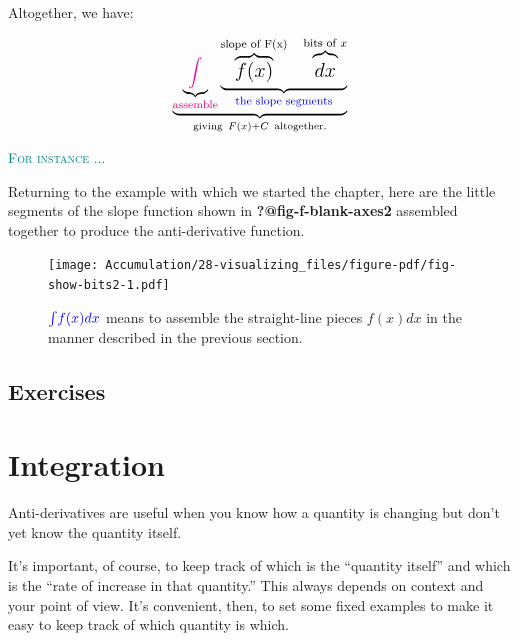 \documentclass[
  letterpaper,
  DIV=11,
  numbers=noendperiod,
  oneside]{scrreprt}
\newenvironment{example}%
{%
\textcolor{teal}{\hrulefill}%
  \par\vspace{.3\baselineskip}%
  \textcolor{teal}{\scshape For instance ...}%
  \par\vspace{\baselineskip}%
}%
{\textcolor{teal}{\hrulefill}}
\begin{document}
Altogether, we have:

\[\large \underbrace{\underbrace{\Large\color{magenta}{\int}}_{\color{magenta}{\text{assemble}}} \underbrace{\Large \overbrace{f(x)}^{\small\text{slope of F(x)}}\ \  \overbrace{\strut dx}^{\small \text{bits of}\ x}}_{\color{blue}{\text{the slope segments}}}}_{\text{giving}\ {\Large F(x)+C}\ \text{altogether.}}\]

\begin{example}

Returning to the example with which we started the chapter, here are the
little segments of the slope function shown in
\textbf{?@fig-f-blank-axes2} assembled together to produce the
anti-derivative function.

\begin{figure}

{\centering \texttt{[image: Accumulation/28-visualizing\_files/figure-pdf/fig-show-bits2-1.pdf]}

}

\caption{\label{fig-show-bits2}\(\color{blue}{\int} f(x)dx\) means to
assemble the straight-line pieces \(f(x) dx\) in the manner described in
the previous section.}

\end{figure}

\end{example}

\hypertarget{exercises-1}{%
\section{Exercises}\label{exercises-1}}

\hypertarget{sec-net-change}{%
\chapter{Integration}\label{sec-net-change}}

Anti-derivatives are useful when you know how a quantity is changing but
don't yet know the quantity itself.

It's important, of course, to keep track of which is the ``quantity
itself'' and which is the ``rate of increase in that quantity.'' This
always depends on context and your point of view. It's convenient, then,
to set some fixed examples to make it easy to keep track of which
quantity is which.
\end{document}
